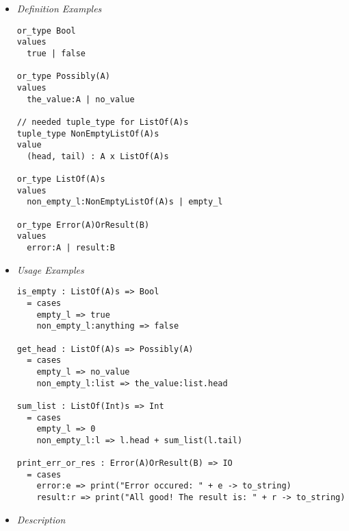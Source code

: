 \documentclass{article}
\begin{document}
\begin{itemize}
\item \textit{Definition Examples}

\begin{verbatim}
or_type Bool
values
  true | false

or_type Possibly(A)
values
  the_value:A | no_value

// needed tuple_type for ListOf(A)s
tuple_type NonEmptyListOf(A)s
value
  (head, tail) : A x ListOf(A)s

or_type ListOf(A)s
values
  non_empty_l:NonEmptyListOf(A)s | empty_l

or_type Error(A)OrResult(B)
values
  error:A | result:B
\end{verbatim}

\item \textit{Usage Examples}

\begin{verbatim}
is_empty : ListOf(A)s => Bool
  = cases
    empty_l => true
    non_empty_l:anything => false

get_head : ListOf(A)s => Possibly(A)
  = cases
    empty_l => no_value
    non_empty_l:list => the_value:list.head

sum_list : ListOf(Int)s => Int
  = cases
    empty_l => 0
    non_empty_l:l => l.head + sum_list(l.tail)

print_err_or_res : Error(A)OrResult(B) => IO
  = cases
    error:e => print("Error occured: " + e -> to_string)
    result:r => print("All good! The result is: " + r -> to_string)
\end{verbatim}

\item \textit{Description}


\end{itemize}
\end{document}
